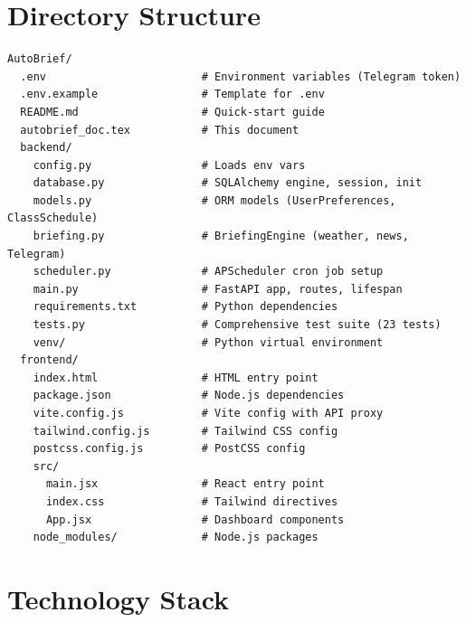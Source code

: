 \documentclass[12pt, a4paper]{article}
\begin{document}
\section{Directory Structure}

\begin{lstlisting}[language={}, title={Project Tree}]
AutoBrief/
  .env                        # Environment variables (Telegram token)
  .env.example                # Template for .env
  README.md                   # Quick-start guide
  autobrief_doc.tex           # This document
  backend/
    config.py                 # Loads env vars
    database.py               # SQLAlchemy engine, session, init
    models.py                 # ORM models (UserPreferences, ClassSchedule)
    briefing.py               # BriefingEngine (weather, news, Telegram)
    scheduler.py              # APScheduler cron job setup
    main.py                   # FastAPI app, routes, lifespan
    requirements.txt          # Python dependencies
    tests.py                  # Comprehensive test suite (23 tests)
    venv/                     # Python virtual environment
  frontend/
    index.html                # HTML entry point
    package.json              # Node.js dependencies
    vite.config.js            # Vite config with API proxy
    tailwind.config.js        # Tailwind CSS config
    postcss.config.js         # PostCSS config
    src/
      main.jsx                # React entry point
      index.css               # Tailwind directives
      App.jsx                 # Dashboard components
    node_modules/             # Node.js packages
\end{lstlisting}

\section{Technology Stack}
\end{document}
